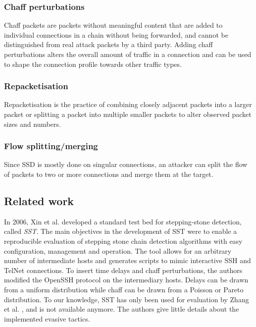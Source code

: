 \documentclass[runningheads]{llncs}\usepackage[]{graphicx}\usepackage[]{color}
\begin{document}
\subsubsection{Chaff perturbations}

Chaff packets are packets without meaningful content that are added to individual connections in a chain without being forwarded, and cannot be distinguished from real attack packets by a third party. Adding chaff perturbations alters the overall amount of traffic in a connection and can be used to shape the connection profile towards other traffic types. 

\subsubsection{Repacketisation}

Repacketisation is the practice of combining closely adjacent packets into a larger packet or splitting a packet into multiple smaller packets to alter observed packet sizes and numbers.

\subsubsection{Flow splitting/merging}

Since SSD is mostly done on singular connections, an attacker can split the flow of packets to two or more connections and merge them at the target. 

\subsection{Related work}\label{Sec:Relatedwork}




In 2006, Xin et al. \cite{xin2006testbed} developed a standard test bed for stepping-stone detection, called \textit{SST}. 
The main objectives in the development of SST were to enable a reproducible evaluation of stepping stone chain detection algorithms with easy configuration, management and operation. The tool allows for an arbitrary number of intermediate hosts and generates scripts to mimic interactive SSH and TelNet connections. 
To insert time delays and chaff perturbations, the authors modified the OpenSSH protocol on the intermediary hosts. Delays can be drawn from a uniform distribution while chaff can be drawn from a Poisson or Pareto distribution. To our knowledge, SST has only been used for evaluation by Zhang et al. \cite{zhang2005stepping}, and is not available anymore. The authors give little details about the implemented evasive tactics.%
\end{document}
